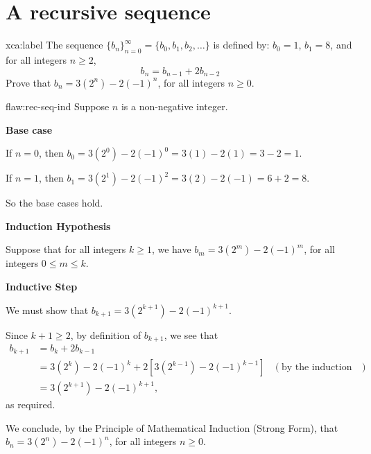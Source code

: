 \section{A recursive sequence}

\begin{xca}{xca:label}
	The sequence $\{b_n\}_{n=0}^\infty = \{b_0,b_1,b_2,\ldots\}$ is defined by: $b_0 = 1$, $b_1 = 8$, and for all integers $n\geq 2$, \[b_n = b_{n-1}+2b_{n-2}\]  Prove that $b_n = 3 (2^n) - 2(-1)^n$, for all integers $n\geq 0$.
\end{xca}

\begin{flaw}{flaw:rec-seq-ind} 
Suppose $n$ is a non-negative integer.

\noindent\textbf{Base case}

If $n=0$, then $b_0 = 3(2^0)-2(-1)^0 = 3(1) -2(1) = 3-2=1$.

If $n=1$, then $b_1 = 3(2^1)-2(-1)^2 = 3(2) -2(-1) = 6+2 = 8$.

So the base cases hold.

\noindent\textbf{Induction Hypothesis}

Suppose that for all integers $k\geq 1$, we have $b_m  = 3 (2^m) - 2(-1)^m$, for all integers $0 \leq m \leq k$.

\noindent\textbf{Inductive Step}

We must show that $b_{k+1} = 3 (2^{k+1}) - 2(-1)^{k+1}$.

Since $k+1 \geq 2$, by definition of $b_{k+1}$, we see that
\begin{align*}
	b_{k+1} %
			& = b_{k} + 2 b_{k-1} \\
			& = 3 (2^k) - 2(-1)^k + 2[ 3 (2^{k-1}) - 2(-1)^{k-1} ] & (\text{by the induction hypothesis})\\
			& = 3(2^{k+1}) - 2(-1)^{k+1},
\end{align*}
as required.  

We conclude, by the Principle of Mathematical Induction (Strong Form), that $b_n = 3 (2^n) - 2(-1)^n$, for all integers $n\geq 0$.	


\end{flaw}

